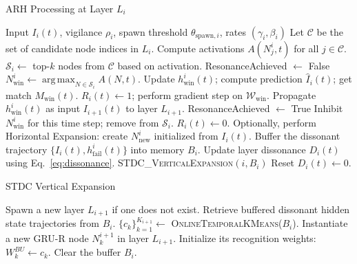 \documentclass{article}
\DeclareMathOperator*{\argmax}{arg\,max}
\numberwithin{figure}{section}
\numberwithin{table}{section}
\numberwithin{algorithm}{section}
\begin{document}
\begin{algorithm}[h]
\caption{ARH Processing at Layer $L_i$}\label{alg:arh_cycle}
\begin{algorithmic}[1]
\Require Input $I_i(t)$, vigilance $\rho_i$, spawn threshold $\theta_{\text{spawn},i}$, rates $(\gamma_i, \beta_i)$
\State Let $\mathcal{C}$ be the set of candidate node indices in $L_i$.
\State Compute activations $A(N_j^i, t)$ for all $j \in \mathcal{C}$.
\State $\mathcal{S}_i \leftarrow$ top-$k$ nodes from $\mathcal{C}$ based on activation.
\State ResonanceAchieved $\leftarrow$ False
    \State $N_{\text{win}}^i \leftarrow \argmax_{N \in \mathcal{S}_i} A(N, t)$.
    \State Update $h_{\text{win}}^i(t)$; compute prediction $\hat{I}_i(t)$; get match $M_{\text{win}}(t)$.
     
        \State $R_i(t) \leftarrow 1$; perform gradient step on $\mathcal{W}_{\text{win}}$.
        \State Propagate $h_{\text{win}}^i(t)$ as input $I_{i+1}(t)$ to layer $L_{i+1}$.
        \State ResonanceAchieved $\leftarrow$ True
    \Else {}
        \State Inhibit $N_{\text{win}}^i$ for this time step; remove from $\mathcal{S}_i$.
    \EndIf
\EndWhile
{} 
    \State $R_i(t) \leftarrow 0$.
    \State Optionally, perform Horizontal Expansion: create $N_{\text{new}}^i$ initialized from $I_i(t)$.
    \State Buffer the dissonant trajectory $\{I_i(t), h_{\text{fail}}^i(t)\}$ into memory $B_i$.
\EndIf
\State Update layer dissonance $D_i(t)$ using Eq.~\eqref{eq:dissonance}.
 
    \State \textsc{STDC\_VerticalExpansion}$(i, B_i)$
    \State Reset $D_i(t) \leftarrow 0$.
\EndIf
\end{algorithmic}
\end{algorithm}

\begin{algorithm}[h]
\caption{STDC Vertical Expansion}\label{alg:vertical_expansion}
\begin{algorithmic}[1]
    \State Spawn a new layer $L_{i+1}$ if one does not exist.
    \State Retrieve buffered dissonant hidden state trajectories from $B_i$.
    \State $\{c_k\}_{k=1}^{K_{i+1}} \leftarrow$ \textsc{OnlineTemporalKMeans}($B_i$). 
        \State Instantiate a new GRU-R node $N_k^{i+1}$ in layer $L_{i+1}$.
        \State Initialize its recognition weights: $W_k^{BU} \leftarrow c_k$.
    \ForEnd
    \State Clear the buffer $B_i$.
\EndProcedure
\end{algorithmic}
\end{algorithm}
\end{document}
